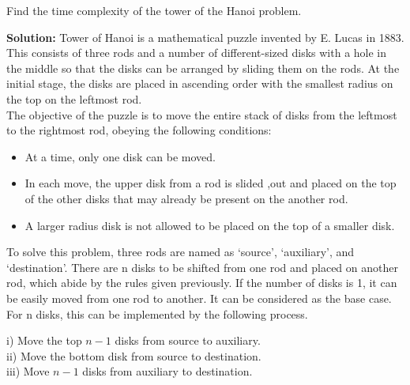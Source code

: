 \documentclass[12pt]{article}
\begin{document}
\vspace*{0.4cm}
\hspace*{0.1cm} Find the time complexity of the tower of the Hanoi problem.\\

\vspace*{0.3cm}

\small{
\textbf{Solution:} Tower of Hanoi is a mathematical puzzle invented by E. Lucas in 1883. This consists of three
rods and a number of different-sized disks with a hole in the middle so that the disks can be arranged by
sliding them on the rods. At the initial stage, the disks are placed in ascending order with the smallest
radius on the top on the leftmost rod.\\
\hspace*{0.5cm} The objective of the puzzle is to move the entire stack of disks from the leftmost to the rightmost rod,
obeying the following conditions:\\
\vspace*{0.2cm}

\begin{itemize}
  \item At a time, only one disk can be moved. \\
  \item In each move, the upper disk from a rod is slided ,out and placed on the top of the other disks that
may already be present on the another rod.\\
  \item A larger radius disk is not allowed to be placed on the top of a smaller disk.\\
\end{itemize}

\vspace*{0.2cm}
\hspace*{0.5cm} To solve this problem, three rods are named as ‘source’, ‘auxiliary’, and ‘destination’. There are n
disks to be shifted from one rod and placed on another rod, which abide by the rules given previously.
If the number of disks is 1, it can be easily moved from one rod to another. It can be considered as the
base case. For n disks, this can be implemented by the following process.\\
}
\vspace*{0.2cm}

i) Move the top $n - 1$ disks from source to auxiliary.\\
ii) Move the bottom disk from source to destination.\\
iii) Move $n - 1$ disks from auxiliary to destination.\\
\end{document}
